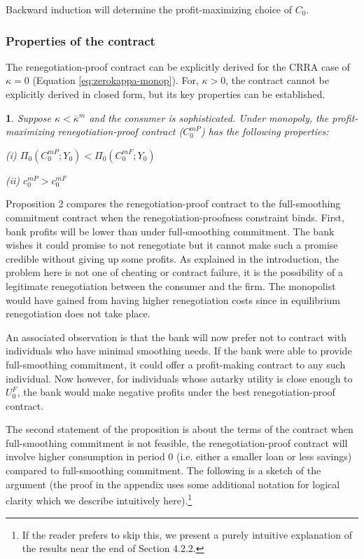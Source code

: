 \documentclass[11pt,english]{article}
\theoremstyle{plain}
\newtheorem{prop}{\protect\propositionname}
\theoremstyle{definition}
\providecommand{\propositionname}{Proposition}
\begin{document}
Backward induction will determine the profit-maximizing choice
of $C_{0}$.

\subsubsection{Properties of the contract}

The renegotiation-proof contract can be explicitly derived for the
CRRA case of $\kappa=0$ (Equation \ref{eq:zerokappa-monop}). For,
$\kappa>0$, the contract cannot be explicitly derived in closed form,
but its key properties can be established.
\begin{prop}
Suppose $\kappa<\bar{\kappa}^{m}$ and the consumer is sophisticated.
Under monopoly, the profit-maximizing renegotiation-proof contract
($C_{0}^{mP}$) has the following properties:

(i) $\Pi_{0}\left(C_{0}^{mP};Y_{0}\right)<\Pi_{0}\left(C_{0}^{mF};Y_{0}\right)$ 

(ii) $c_{0}^{mP}>c_{0}^{mF}$
\end{prop}
Proposition 2 compares the renegotiation-proof contract to the full-smoothing
commitment contract when the renegotiation-proofness constraint binds.
First, bank profits will be lower than under full-smoothing commitment.
The bank wishes it could promise to not renegotiate but it cannot
make such a promise credible without giving up some profits. As explained
in the introduction, the problem here is not one of cheating or contract
failure, it is the possibility of a legitimate renegotiation between
the consumer and the firm. The monopolist would have gained from having
higher renegotiation costs since in equilibrium renegotiation does
not take place.

An associated observation is that the bank will now prefer not to
contract with individuals who have minimal smoothing needs. If the
bank were able to provide full-smoothing commitment, it could offer
a profit-making contract to any such individual. Now however, for
individuals whose autarky utility is close enough to $U_{0}^{F}$,
the bank would make negative profits under the best renegotiation-proof
contract.

The second statement of the proposition is about the terms of the
contract \textendash{} when full-smoothing commitment is not feasible,
the renegotiation-proof contract will involve higher consumption in
period 0 (i.e. either a smaller loan or less savings) compared to
full-smoothing commitment. The following is a sketch of the argument
(the proof in the appendix uses some additional notation for logical
clarity which we describe intuitively here).\footnote{If the reader prefers to skip this, we present a purely intuitive
explanation of the results near the end of Section 4.2.2.} 
\end{document}
